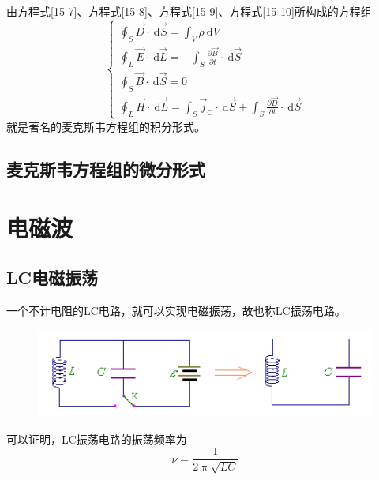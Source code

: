 \documentclass[12pt]{article}
\begin{document}
由方程式\ref{15-7}、方程式\ref{15-8}、方程式\ref{15-9}、方程式\ref{15-10}所构成的方程组
\begin{equation}
\displaystyle
\left\{\begin{array}{l}
\oint_S \overrightarrow{D} \cdot \mathrm{~d} \overrightarrow{S}=\int_V \rho \mathrm{~d} V \\
\oint_L \overrightarrow{E} \cdot \mathrm{~d} \overrightarrow{L}=-\int_S \frac{\partial \overrightarrow{B}}{\partial t} \cdot \mathrm{~d} \overrightarrow{S} \\
\oint_S \overrightarrow{B} \cdot \mathrm{~d} \overrightarrow{S}=0 \\
\oint_L \overrightarrow{H} \cdot \mathrm{~d} \overrightarrow{L}=\int_S \overrightarrow{j}_{\mathrm{C}} \cdot \mathrm{~d} \overrightarrow{S}+\int_S \frac{\partial \overrightarrow{D}}{\partial t} \cdot \mathrm{~d} \overrightarrow{S}
\end{array}\right.
\end{equation}
就是著名的麦克斯韦方程组的积分形式。

\subsection{麦克斯韦方程组的微分形式}

\section{电磁波}

\subsection{LC电磁振荡}

一个不计电阻的LC电路，就可以实现电磁振荡，故也称LC振荡电路。
\begin{figure}[!h]
    \centering
    \includegraphics[width = .8\textwidth]{graphics/LC振荡电路.png}
\end{figure}

可以证明，LC振荡电路的振荡频率为
\begin{equation}
    \nu = \frac{1}{2 \uppi \sqrt{LC}}
\end{equation}
\end{document}
